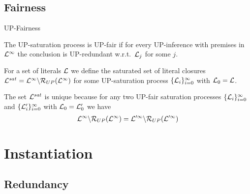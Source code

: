 \documentclass[%
handout,
]{beamer}
\begin{document}
\subsection{Fairness}
\begin{frame}{UP-Fairness}

        The UP-saturation process is {UP-fair} if for every UP-inference
        with premises in \( \mathcal{L}^\infty \) the conclusion is UP-redundant
        w.r.t.~\(\mathcal{L}_j\) for some \(j\).

        For a set of literals \( \mathcal{L} \) we define
        the saturated set of literal closures
        \( \mathcal{L}^{sat} = \mathcal{L}^\infty\backslash\mathcal{R}_{UP}(\mathcal{L}^\infty) \)
        for some UP-saturation process
        \( \{ \mathcal{L}_i\}_{i=0}^\infty \)
        with $\mathcal{L}_0 = \mathcal{L}$.

        \vspace{1.4em}

    \begin{lemma}
        The set \( \mathcal{L}^{sat} \) is unique because
        for any two UP-fair saturation processes
        \(\{ \mathcal{L}_i
            \}_{i=0}^\infty\) and
            \(\{ \mathcal{L}'_i
            \}_{i=0}^\infty\)
            with $\mathcal{L}_0 = \mathcal{L}'_0$ we have
            \begin{gather*}
                \mathcal{L}^\infty \backslash \mathcal{R}_{UP}(\mathcal{L}^\infty)
                =
                \mathcal{L}'^\infty \backslash \mathcal{R}_{UP}(\mathcal{L}'^\infty)
            \end{gather*}
    \end{lemma}
\end{frame}

\section{Instantiation}
\subsection{Redundancy}
\end{document}
